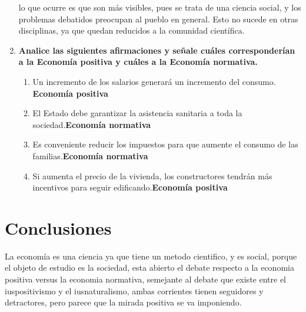 \documentclass[12pt]{book}
\begin{document}
\begin{enumerate}
lo que ocurre es que son más visibles, pues se trata de una ciencia social, y los problemas debatidos preocupan al pueblo en general. Esto no sucede en otras disciplinas, ya que quedan reducidos a la comunidad científica.

\item \textbf{Analice las siguientes afirmaciones y señale cuáles corresponderían a la Economía positiva y cuáles a la Economía normativa.}
\begin{enumerate}
\item Un incremento de los salarios generará un incremento del consumo. \textbf{Economía positiva}
\item El Estado debe garantizar la asistencia sanitaria a toda la sociedad.\textbf{Economía normativa}
\item Es conveniente reducir los impuestos para que aumente el consumo de las familias.\textbf{Economía normativa}
\item Si aumenta el precio de la vivienda, los constructores tendrán más incentivos para seguir edificando.\textbf{Economía positiva}
\end{enumerate}



\end{enumerate}

\chapter{Conclusiones}
La econom\'ia es una ciencia ya que tiene un metodo cientifico, y es social, porque el objeto de estudio es la sociedad, esta abierto el debate respecto a la economia positiva versus la economia normativa, semejante al debate que existe entre el iuspositivismo y el iusnaturalismo, ambas corrientes tienen seguidores y detractores, pero parece que la mirada positiva se va imponiendo.
\end{document}
